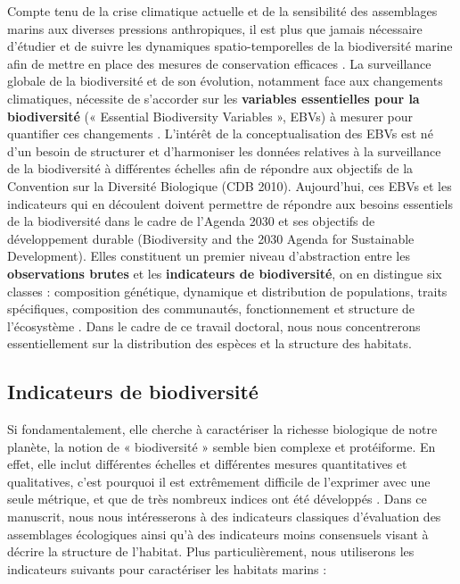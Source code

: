 Compte tenu de la crise climatique actuelle et de la sensibilité des assemblages marins aux diverses pressions anthropiques, il est plus que jamais nécessaire d’étudier et de suivre les dynamiques spatio-temporelles de la biodiversité marine afin de mettre en place des mesures de conservation efficaces \citep{magris_integrating_2014, klein_shortfalls_2015}. La surveillance globale de la biodiversité et de son évolution, notamment face aux changements climatiques, nécessite de s’accorder sur les \textbf{variables essentielles pour la biodiversité} (« Essential Biodiversity Variables », EBVs) à mesurer pour quantifier ces changements \citep{pereira_essential_2013, navarro_monitoring_2017, schmeller_operational_2017, haase_next_2018, kissling_building_2018}. L’intérêt de la conceptualisation des EBVs est né d’un besoin de structurer et d’harmoniser les données relatives à la surveillance de la biodiversité à différentes échelles \citep{kissling_building_2018} afin de répondre aux objectifs de la Convention sur la Diversité Biologique (CDB 2010). Aujourd’hui, ces EBVs et les indicateurs qui en découlent doivent permettre de répondre aux besoins essentiels de la biodiversité dans le cadre de l’Agenda 2030 et ses objectifs de développement durable (Biodiversity and the 2030 Agenda for Sustainable Development). Elles constituent un premier niveau d’abstraction entre les \textbf{observations brutes} et les \textbf{indicateurs de biodiversité}, on en distingue six classes : composition génétique, dynamique et distribution de populations, traits spécifiques, composition des communautés, fonctionnement et structure de l’écosystème \citep{pereira_essential_2013}. Dans le cadre de ce travail doctoral, nous nous concentrerons essentiellement sur la distribution des espèces et la structure des habitats.

\subsection{Indicateurs de biodiversité}\label{intro.2.1}

Si fondamentalement, elle cherche à caractériser la richesse biologique de notre planète, la notion de « biodiversité » semble bien complexe et protéiforme. En effet, elle inclut différentes échelles et différentes mesures quantitatives et qualitatives, c’est pourquoi il est extrêmement difficile de l’exprimer avec une seule métrique, et que de très nombreux indices ont été développés \citep{teixeira_catalogue_2016}. Dans ce manuscrit, nous nous intéresserons à des indicateurs classiques d’évaluation des assemblages écologiques ainsi qu’à des indicateurs moins consensuels visant à décrire la structure de l’habitat. Plus particulièrement, nous utiliserons les indicateurs suivants pour caractériser les habitats marins :

